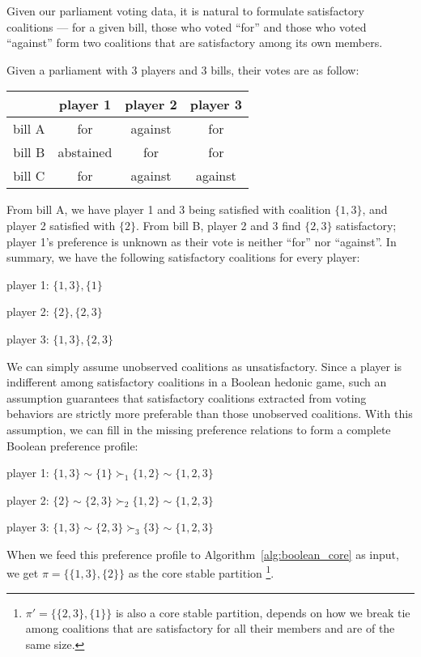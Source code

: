 Given our parliament voting data, it is natural to formulate satisfactory
coalitions --- for a given bill, those who voted ``for'' and those who voted
``against'' form two coalitions that are satisfactory among its own members.

\begin{example}
\label{example:votes_boolean}
  Given a parliament with 3 players and 3 bills, their votes are as follow:

  \begin{table}[ht]
  \centering
  \begin{tabular}{|c|c|c|c|}
  \hline
         & player 1  & player 2 & player 3 \\ \hline
  bill A & for       & against  & for \\
  bill B & abstained & for      & for \\
  bill C & for       & against  & against \\
  \hline
  \end{tabular}
  \end{table}
\end{example}

From bill A, we have player 1 and 3 being satisfied with coalition $\{1, 3\}$,
and player 2 satisfied with $\{2\}$.
From bill B, player 2 and 3 find $\{2, 3\}$ satisfactory; player 1's preference
is unknown as their vote is neither ``for'' nor ``against''.
In summary, we have the following satisfactory coalitions for every player:

player 1: $\{1, 3\}, \{1\}$

player 2: $\{2\}, \{2, 3\}$

player 3: $\{1, 3\}, \{2, 3\}$

We can simply assume unobserved coalitions as unsatisfactory.
Since a player is indifferent among satisfactory coalitions in a Boolean hedonic
game, such an assumption guarantees that satisfactory coalitions extracted from
voting behaviors are strictly more preferable than those unobserved coalitions.
With this assumption, we can fill in the missing preference relations to
form a complete Boolean preference profile:

player 1: $\{1, 3\} \sim \{1\} \succ_1 \{1, 2\} \sim \{1, 2, 3\}$

player 2: $\{2\} \sim \{2, 3\} \succ_2 \{1, 2\} \sim \{1, 2, 3\}$

player 3: $\{1, 3\} \sim \{2, 3\} \succ_3 \{3\} \sim \{1, 2, 3\}$

When we feed this preference profile to Algorithm~\ref{alg:boolean_core} as
input, we get $\pi = \{\{1, 3\}, \{2\}\}$ as the core stable partition
\footnote{$\pi' = \{\{2, 3\}, \{1\}\}$ is also a core stable partition, depends
on how we break tie among coalitions that are satisfactory for all their members
and are of the same size.}.

